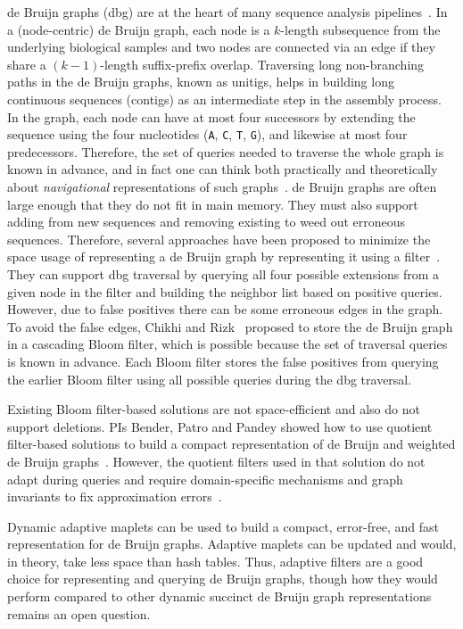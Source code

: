    de Bruijn graphs (dbg) are at the heart of many sequence analysis pipelines~\cite{PandeyBJP17a, PandeyBJP17b}. In a (node-centric) de Bruijn graph, each node is a $k$-length subsequence from the underlying biological samples and two nodes are connected via an edge if they share a $(k-1)$-length suffix-prefix overlap.  Traversing long non-branching paths in the de Bruijn graphs, known as unitigs, helps in building long continuous sequences (contigs) as an intermediate step in the assembly process.
In the graph, each node can have at most four successors by extending the sequence using the four nucleotides (\texttt{A}, \texttt{C}, \texttt{T}, \texttt{G}), and likewise at most four predecessors. Therefore, the set of queries needed to traverse the whole graph is known in advance, and in fact one can think both practically and theoretically about \emph{navigational} representations of such graphs~\cite{Chikhi2015}.
%
de Bruijn graphs are often large enough that they do not fit in main memory. They must also support adding \kmers from new sequences and removing existing \kmers to weed out erroneous sequences.
Therefore, several approaches have been proposed to minimize the space usage of representing a de Bruijn graph by representing it using a  filter~\cite{chikhi2013space}. They can support dbg traversal by querying all four possible extensions from a given node in the filter and building the neighbor list based on positive queries. However, due to false positives there can be some erroneous edges in the graph.
To avoid the false edges, Chikhi and Rizk~\cite{chikhi2013space} proposed to store the de Bruijn graph in a cascading Bloom filter, which is possible because the set of traversal queries is known in advance. Each Bloom filter stores the false positives from querying the earlier Bloom filter using all possible queries during the dbg traversal.

Existing Bloom filter-based solutions are not space-efficient and also do not support deletions. PIs Bender, Patro and Pandey showed how to use quotient filter-based solutions to build a compact representation of de Bruijn and weighted de Bruijn graphs~\cite{PandeyBJP17b}. However, the quotient filters used in that solution do not adapt during queries and require domain-specific mechanisms and graph invariants to fix approximation errors~\cite{PandeyBJP17b}.


Dynamic adaptive maplets can be used to build a compact, error-free, and fast representation for de Bruijn graphs. Adaptive maplets can be updated and  would, in theory, take less space than hash tables. Thus, adaptive filters are a good choice for representing and querying de Bruijn graphs, though how they would perform compared to other dynamic succinct de Bruijn graph representations~\cite{DBLP:journals/bioinformatics/AlipanahiKPSB21} remains an open question.




